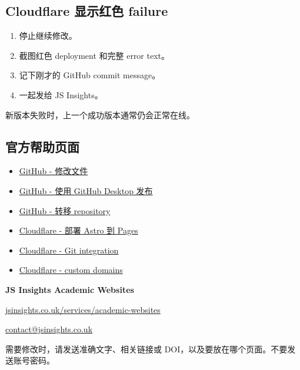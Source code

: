 \documentclass[10pt,a4paper]{article}
\begin{document}
\subsection{Cloudflare 显示红色 failure}

\begin{tcolorbox}[alert]
\begin{enumerate}
  \item 停止继续修改。
  \item 截图红色 deployment 和完整 error text。
  \item 记下刚才的 GitHub commit message。
  \item 一起发给 JS Insights。
\end{enumerate}
新版本失败时，上一个成功版本通常仍会正常在线。
\end{tcolorbox}

\subsection{官方帮助页面}

\begin{itemize}
  \item \href{https://docs.github.com/en/repositories/working-with-files/managing-files/editing-files}{GitHub - 修改文件}
  \item \href{https://docs.github.com/en/desktop/overview/creating-your-first-repository-using-github-desktop}{GitHub - 使用 GitHub Desktop 发布}
  \item \href{https://docs.github.com/en/repositories/creating-and-managing-repositories/transferring-a-repository}{GitHub - 转移 repository}
  \item \href{https://developers.cloudflare.com/pages/framework-guides/deploy-an-astro-site/}{Cloudflare - 部署 Astro 到 Pages}
  \item \href{https://developers.cloudflare.com/pages/configuration/git-integration/}{Cloudflare - Git integration}
  \item \href{https://developers.cloudflare.com/pages/configuration/custom-domains/}{Cloudflare - custom domains}
\end{itemize}

\vfill
\begin{tcolorbox}[navy,left=7mm,right=7mm,top=6mm,bottom=6mm]
  {\Large\bfseries JS Insights Academic Websites}\par\vspace{1.5mm}
  \href{https://jsinsights.co.uk/services/academic-websites/}{jsinsights.co.uk/services/academic-websites}\par
  \href{mailto:contact@jsinsights.co.uk}{contact@jsinsights.co.uk}\par\vspace{3mm}
  需要修改时，请发送准确文字、相关链接或 DOI，以及要放在哪个页面。不要发送账号密码。
\end{tcolorbox}
\end{document}
